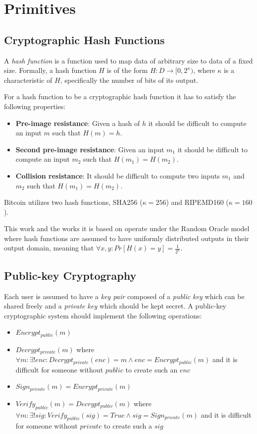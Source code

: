 \section{Primitives}
\subsection{Cryptographic Hash Functions}
A \textit{hash function} is a function used to map data of arbitrary size to data of a fixed size. Formally, a hash function $H$ is of the form $H: D \rightarrow [0, 2^\kappa)$, where $\kappa$ is a characteristic of $H$, specifically the number of bits of its output.

For a hash function to be a cryptographic hash function it has to satisfy the following properties:
\begin{itemize}
  \item \textbf{Pre-image resistance}: Given a hash of $h$ it should be difficult to compute an input $m$ such that $H(m) = h$.
  \item \textbf{Second pre-image resistance}: Given an input $m_1$ it should be difficult to compute an input $m_2$ such that $H(m_1) = H(m_2)$.
  \item \textbf{Collision resistance}: It should be difficult to compute two inputs $m_1$ and $m_2$ such that $H(m_1) = H(m_2)$.
\end{itemize}

Bitcoin utilizes two hash functions, SHA256 ($\kappa=256$) and RIPEMD160 ($\kappa=160$).

This work and the works it is based on \cite{nipopows} operate under the Random Oracle model where hash functions are assumed to have uniformly distributed outputs in their output domain, meaning that $\forall x, y: Pr[H(x) = y] = \frac{1}{2^\kappa}$.

\subsection{Public-key Cryptography}
Each user is assumed to have a \textit{key pair} composed of a \textit{public key} which can be shared freely and a \textit{private key} which should be kept secret. A public-key cryptographic system should implement the following operations:

\begin{itemize}
  \item $Encrypt_{public}(m)$
  \item $Decrypt_{private}(m)$ where $\forall m: \exists! enc: Decrypt_{private}(enc) = m \land enc = Encrypt_{public}(m)$ and it is difficult for someone without $public$ to create such an $enc$
  \item $Sign_{private}(m) = Encrypt_{private}(m)$
  \item $Verify_{public}(m) = Decrypt_{public}(m)$ where $\forall m: \exists! sig: Verify_{public}(sig) = True \land sig = Sign_{private}(m)$ and it is difficult for someone without $private$ to create such a $sig$
\end{itemize}

